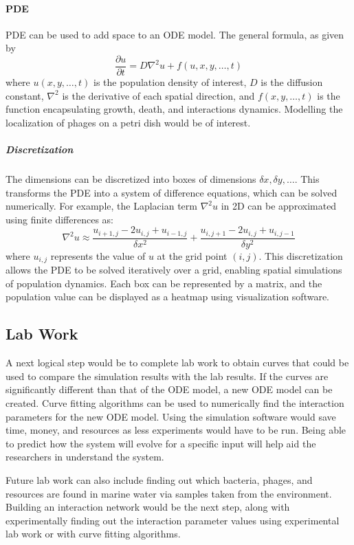 \paragraph{PDE}
PDE can be used to add space to an ODE model. 
The general formula, as given by 
\[
    \frac{\partial u}{\partial t} = D\nabla^2u + f(u, x, y, \dots, t)
\] where $u(x, y, \dots, t)$ is the population density of interest, $D$ is the diffusion constant, $\nabla^2$ is the derivative of each spatial direction, and $f(x, y, \dots, t)$ is the function encapsulating growth, death, and interactions dynamics. 
Modelling the localization of phages on a petri dish would be of interest. 
\subparagraph{Discretization}
The dimensions can be discretized into boxes of dimensions $\delta x, \delta y, \dots$. 
This transforms the PDE into a system of difference equations, which can be solved numerically. 
For example, the Laplacian term $\nabla^2 u$ in 2D can be approximated using finite differences as:
\[
    \nabla^2 u \approx \frac{u_{i+1,j} - 2u_{i,j} + u_{i-1,j}}{\delta x^2} + \frac{u_{i,j+1} - 2u_{i,j} + u_{i,j-1}}{\delta y^2}
\]
where $u_{i,j}$ represents the value of $u$ at the grid point $(i, j)$. 
This discretization allows the PDE to be solved iteratively over a grid, enabling spatial simulations of population dynamics. 
Each box can be represented by a matrix, and the population value can be displayed as a heatmap using visualization software. 

\subsection{Lab Work}
A next logical step would be to complete lab work to obtain curves that could be used to compare the simulation results with the lab results. 
If the curves are significantly different than that of the ODE model, a new ODE model can be created. 
Curve fitting algorithms can be used to numerically find the interaction parameters for the new ODE model. 
Using the simulation software would save time, money, and resources as less experiments would have to be run. 
Being able to predict how the system will evolve for a specific input will help aid the researchers in understand the system. 

Future lab work can also include finding out which bacteria, phages, and resources are found in marine water via samples taken from the environment. 
Building an interaction network would be the next step, along with experimentally finding out the interaction parameter values using experimental lab work or with curve fitting algorithms. 

